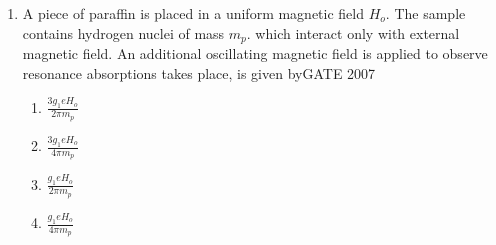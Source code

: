 \documentclass[journal]{IEEEtran}
\begin{document}
\begin{enumerate}
\begin{enumerate}
\end{enumerate}
\item A piece of paraffin is placed in a uniform magnetic field $H_o$. The sample contains hydrogen nuclei of mass $m_p$. which interact only with external magnetic field. An additional oscillating magnetic field is applied to observe resonance absorptions takes place, is given by\hfill{GATE 2007}
\begin{enumerate}
    \item $\frac{3g_1 eH_o}{2\pi m_p}$
    \item $\frac{3g_1 eH_o}{4\pi m_p}$
    \item $\frac{g_1 eH_o}{2\pi m_p}$
    \item $\frac{g_1 eH_o}{4\pi m_p}$
\end{enumerate}
\end{enumerate}
\end{document}
